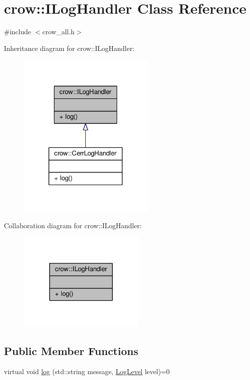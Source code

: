 \hypertarget{classcrow_1_1_i_log_handler}{\section{crow\-:\-:I\-Log\-Handler Class Reference}
\label{classcrow_1_1_i_log_handler}
}


{\ttfamily \#include $<$crow\-\_\-all.\-h$>$}



Inheritance diagram for crow\-:\-:I\-Log\-Handler\-:
\nopagebreak
\begin{figure}[H]
\begin{center}
\leavevmode
\includegraphics[width=190pt]{classcrow_1_1_i_log_handler__inherit__graph}
\end{center}
\end{figure}


Collaboration diagram for crow\-:\-:I\-Log\-Handler\-:
\nopagebreak
\begin{figure}[H]
\begin{center}
\leavevmode
\includegraphics[width=176pt]{classcrow_1_1_i_log_handler__coll__graph}
\end{center}
\end{figure}
\subsection*{Public Member Functions}
\begin{DoxyCompactItemize}
\item 
virtual void \hyperlink{classcrow_1_1_i_log_handler_ae17f05549983c9d7d6aea77cda589f60}{log} (std\-::string message, \hyperlink{namespacecrow_ad07dc32e163caa516aa1225a1ec4afe4}{Log\-Level} level)=0
\end{DoxyCompactItemize}


